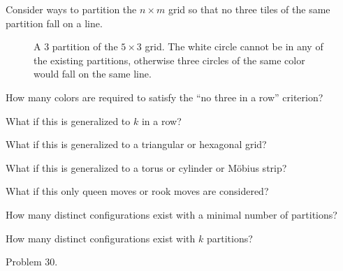 \documentclass{article}
\begin{document}
Consider ways to partition the $n \times m$ grid so that no three tiles of the
same partition fall on a line.
\begin{figure}[!h]
  \centering
  \caption{
    A $3$ partition of the $5 \times 3$ grid. The white circle cannot be in
    any of the existing partitions, otherwise three circles of the same
    color would fall on the same line.
  }
\end{figure}

\begin{question}
  How many colors are required to satisfy the ``no three in a row'' criterion?
\end{question}
\begin{related}
  \item What if this is generalized to $k$ in a row?
  \item What if this is generalized to a triangular or hexagonal grid?
  \item What if this is generalized to a torus or cylinder or M\"obius strip?
  \item What if this only queen moves or rook moves are considered?
  \item How many distinct configurations exist with a minimal number of partitions?
  \item How many distinct configurations exist with $k$ partitions?
\end{related}
\begin{references}
  \item Problem 30.
\end{references}
\end{document}
